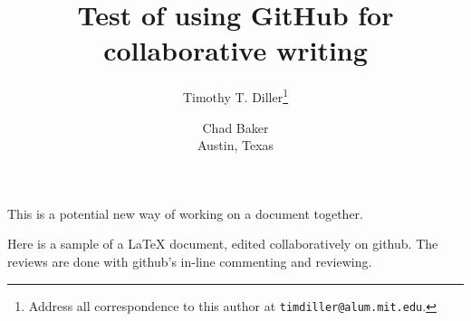 \documentclass[10pt,a4paper]{article}
\title{Test of using GitHub for collaborative writing}
\author{Timothy T. Diller\thanks{Address all correspondence to this
    author at \texttt{timdiller@alum.mit.edu}.} \and Chad Baker\\Austin, Texas}
\begin{document}
\maketitle
This is a potential new way of working on a document together.

Here is a sample of a \LaTeX{} document, edited collaboratively on github.
The reviews are done with github's in-line commenting and reviewing.
\end{document}
